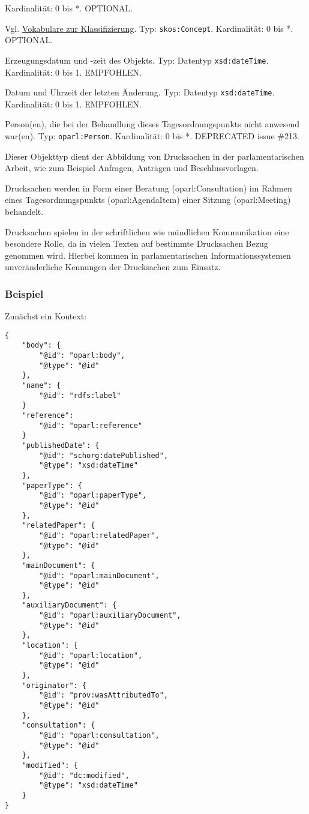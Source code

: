 \documentclass[,a4paper]{article}
\begin{document}
\begin{description}
Kardinalität: 0 bis *. OPTIONAL.
\item[\texttt{keyword}]
Vgl. \hyperref[vokabulareux5fklassifizierung]{Vokabulare zur
Klassifizierung}. Typ: \texttt{skos:Concept}. Kardinalität: 0 bis *.
OPTIONAL.
\item[\texttt{created}]
Erzeugungsdatum und -zeit des Objekts. Typ: Datentyp
\texttt{xsd:dateTime}. Kardinalität: 0 bis 1. EMPFOHLEN.
\item[\texttt{modified}]
Datum und Uhrzeit der letzten Änderung. Typ: Datentyp
\texttt{xsd:dateTime}. Kardinalität: 0 bis 1. EMPFOHLEN.
\item[\texttt{absentParticipant}]
Person(en), die bei der Behandlung dieses Tagesordnungspunkts nicht
anwesend war(en). Typ: \texttt{oparl:Person}. Kardinalität: 0 bis *.
DEPRECATED issue \#213.
\end{description}


Dieser Objekttyp dient der Abbildung von Drucksachen in der
parlamentarischen Arbeit, wie zum Beispiel Anfragen, Anträgen und
Beschlussvorlagen.

Drucksachen werden in Form einer Beratung (oparl:Consultation) im Rahmen
eines Tagesordnungspunkts (oparl:AgendaItem) einer Sitzung
(oparl:Meeting) behandelt.

Drucksachen spielen in der schriftlichen wie mündlichen Kommunikation
eine besondere Rolle, da in vielen Texten auf bestimmte Drucksachen
Bezug genommen wird. Hierbei kommen in parlamentarischen
Informationssystemen unveränderliche Kennungen der Drucksachen zum
Einsatz.

\subsubsection{Beispiel}\label{beispiel-6}

Zunächst ein Kontext:

\begin{verbatim}
{
    "body": {
        "@id": "oparl:body",
        "@type": "@id"
    },
    "name": {
        "@id": "rdfs:label"
    }
    "reference":
        "@id": "oparl:reference"
    }
    "publishedDate": {
        "@id": "schorg:datePublished",
        "@type": "xsd:dateTime"
    },  
    "paperType": {
        "@id": "oparl:paperType",
        "@type": "@id"
    },  
    "relatedPaper": {
        "@id": "oparl:relatedPaper",
        "@type": "@id"
    },
    "mainDocument": {
        "@id": "oparl:mainDocument",
        "@type": "@id"
    },
    "auxiliaryDocument": {
        "@id": "oparl:auxiliaryDocument",
        "@type": "@id"
    },
    "location": {
        "@id": "oparl:location",
        "@type": "@id"
    },
    "originator": {
        "@id": "prov:wasAttributedTo",
        "@type": "@id"
    },
    "consultation": {
        "@id": "oparl:consultation",
        "@type": "@id"
    },
    "modified": {
        "@id": "dc:modified",
        "@type": "xsd:dateTime"
    }
}
\end{verbatim}
\end{document}

